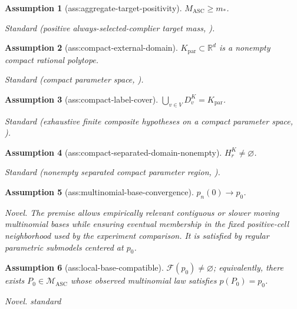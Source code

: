 \documentclass{article}
\newtheorem{assumption}{Assumption}
\begin{document}
\begin{assumption}[ass:aggregate-target-positivity]\label{ass:aggregate-target-positivity}
\(M_{\mathrm{ASC}}\ge m_{*}\).
\par\smallskip\noindent\emph{Standard} (positive always-selected-complier target mass, \cite{DongHeiler2026}).
\end{assumption}

\begin{assumption}[ass:compact-external-domain]\label{ass:compact-external-domain}
\(K_{\mathrm{par}}\subset\mathbb R^d\) is a nonempty compact rational polytope.
\par\smallskip\noindent\emph{Standard} (compact parameter space, \cite{SchaferStark2009}).
\end{assumption}

\begin{assumption}[ass:compact-label-cover]\label{ass:compact-label-cover}
\(\bigcup_{v\in V}D_v^K=K_{\mathrm{par}}\).
\par\smallskip\noindent\emph{Standard} (exhaustive finite composite hypotheses on a compact parameter space, \cite{GoldenshlugerJuditskyNemirovski2015}).
\end{assumption}

\begin{assumption}[ass:compact-separated-domain-nonempty]\label{ass:compact-separated-domain-nonempty}
\(H_r^K\ne\varnothing\).
\par\smallskip\noindent\emph{Standard} (nonempty separated compact parameter region, \cite{GoldenshlugerJuditskyNemirovski2015}).
\end{assumption}

\begin{assumption}[ass:multinomial-base-convergence]\label{ass:multinomial-base-convergence}
\(p_n(0)\to p_0\).
\par\smallskip\noindent\emph{Novel.} The premise allows empirically relevant contiguous or slower moving multinomial bases while ensuring eventual membership in the fixed positive-cell neighborhood used by the experiment comparison. It is satisfied by regular parametric submodels centered at \(p_0\).
\end{assumption}

\begin{assumption}[ass:local-base-compatible]\label{ass:local-base-compatible}
\(\mathcal F(p_0)\ne\varnothing\); equivalently, there exists \(P_0\in\mathcal M_{\mathrm{ASC}}\) whose observed multinomial law satisfies \(p(P_0)=p_0\).
\par\smallskip\noindent\emph{Novel.} standard
\end{assumption}
\end{document}
